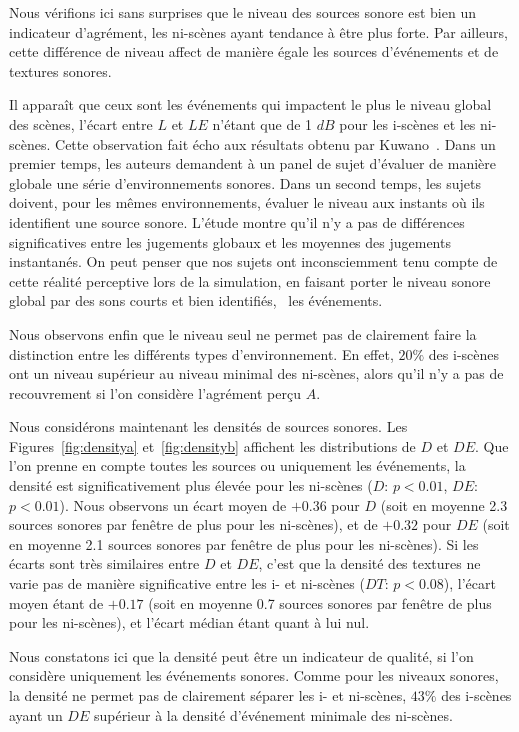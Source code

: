 Nous vérifions ici sans surprises que le niveau des sources sonore est bien un indicateur d'agrément, les ni-scènes ayant tendance à être plus forte. Par ailleurs, cette différence de niveau affect de manière égale les sources d'événements et de textures sonores. 

Il apparaît que ceux sont les événements qui impactent le plus le niveau global des scènes, l'écart entre $L$ et $LE$ n'étant que de 1 $dB$ pour les i-scènes et les ni-scènes. Cette observation fait écho aux résultats obtenu par Kuwano~\al \citep{kuwano_memory_2003}. Dans un premier temps, les auteurs demandent à un panel de sujet d'évaluer de manière globale une série d'environnements sonores. Dans un second temps, les sujets doivent, pour les mêmes environnements, évaluer le niveau aux instants où ils identifient une source sonore. L'étude montre qu'il n'y a pas de différences significatives entre les jugements globaux et les moyennes des jugements instantanés. On peut penser que nos sujets ont inconsciemment tenu compte de cette réalité perceptive lors de la simulation, en faisant porter le niveau sonore global par des sons courts et bien identifiés, \ie~les événements.

Nous observons enfin que le niveau seul ne permet pas de clairement faire la distinction entre les différents types d'environnement. En effet,  $20\%$ des i-scènes ont un niveau supérieur au niveau minimal des ni-scènes, alors qu'il n'y a pas de recouvrement si l'on considère l'agrément perçu $A$.

Nous considérons maintenant les densités de sources sonores. Les Figures~\ref{fig:densitya} et~\ref{fig:densityb} affichent les distributions de $D$ et $DE$. Que l'on prenne en compte toutes les sources ou uniquement les événements, la densité est significativement plus élevée pour les ni-scènes ($D$: $p<0.01$, $DE$: $p<0.01$). Nous observons un écart moyen de $+0.36$ pour $D$ (soit en moyenne 2.3 sources sonores par fenêtre de plus pour les ni-scènes), et de $+0.32$ pour $DE$ (soit en moyenne 2.1 sources sonores par fenêtre de plus pour les ni-scènes). Si les écarts sont très similaires entre $D$ et $DE$, c'est que la densité des textures ne varie pas de manière significative entre les i- et ni-scènes ($DT$: $p<0.08$), l'écart moyen étant de $+0.17$ (soit en moyenne 0.7 sources sonores par fenêtre de plus pour les ni-scènes), et l'écart médian étant quant à lui nul.

Nous constatons ici que la densité peut être un indicateur de qualité, si l'on considère uniquement les événements sonores. Comme pour les niveaux sonores, la densité ne permet pas de clairement séparer les i- et ni-scènes,  $43\%$ des i-scènes ayant un $DE$ supérieur à la densité d'événement minimale des ni-scènes.

